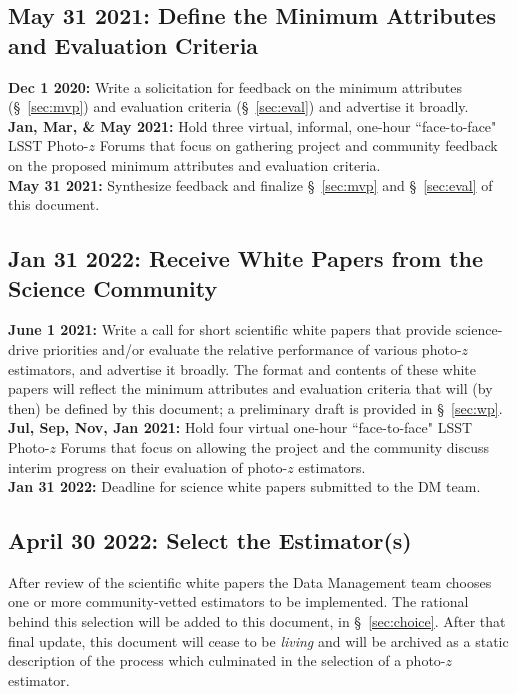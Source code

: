 \documentclass[DM,lsstdraft,toc]{lsstdoc}
\begin{document}
\subsection{May 31 2021: Define the Minimum Attributes and Evaluation Criteria}\label{ssec:time_mvp}

{\bf Dec 1 2020:} Write a solicitation for feedback on the minimum attributes (\S~\ref{sec:mvp}) and evaluation criteria (\S~\ref{sec:eval}) and advertise it broadly. \\
{\bf Jan, Mar, \& May 2021:} Hold three virtual, informal, one-hour ``face-to-face" LSST Photo-$z$ Forums that focus on gathering project and community feedback on the proposed minimum attributes and evaluation criteria. \\
{\bf May 31 2021:} Synthesize feedback and finalize \S~\ref{sec:mvp} and \S~\ref{sec:eval} of this document.

\subsection{Jan 31 2022: Receive White Papers from the Science Community}\label{ssec:time_wp}

{\bf June 1 2021:} Write a call for short scientific white papers that provide science-drive priorities and/or evaluate the relative performance of various photo-$z$ estimators, and advertise it broadly.
The format and contents of these white papers will reflect the minimum attributes and evaluation criteria that will (by then) be defined by this document; a preliminary draft is provided in \S~\ref{sec:wp}. \\
{\bf Jul, Sep, Nov, Jan 2021:} Hold four virtual one-hour ``face-to-face" LSST Photo-$z$ Forums that focus on allowing the project and the community discuss interim progress on their evaluation of photo-$z$ estimators. \\
{\bf Jan 31 2022:} Deadline for science white papers submitted to the DM team.

\subsection{April 30 2022: Select the Estimator(s)}\label{ssec:time_sel}

After review of the scientific white papers the Data Management team chooses one or more community-vetted estimators to be implemented.
The rational behind this selection will be added to this document, in \S~\ref{sec:choice}. 
After that final update, this document will cease to be {\it living} and will be archived as a static description of the process which culminated in the selection of a photo-$z$ estimator.
\end{document}

